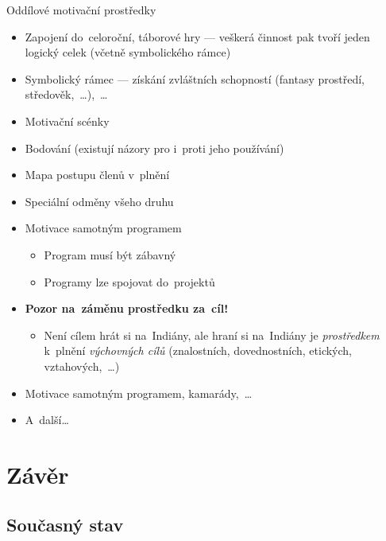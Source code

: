 \documentclass[compress, ucs, xelatex, 11pt, xcolor=dvipsnames, print, aspectratio=169,
	hyperref={
		bookmarks=true,
		unicode=true,
		colorlinks=true,
		pdftitle={Skautska vychovna metoda},
		plainpages=false,
		pdfauthor={Vojtech Zeisek},
		pdfsubject={Skautska vychovna metoda a jeji vyvoj za posledni stoleti a desetileti},
		pdfcreator={XeLaTeX},
		pdfkeywords={Junak, Pedagogika, Skaut, Skauting, Vychovna metoda},
		linkcolor=Red, %
		anchorcolor=ForestGreen, %
		citecolor=ForestGreen, %
		filecolor=ForestGreen, %
		menucolor=ForestGreen, %
		urlcolor=Sepia, %
		pdftex},
	url={hyphens, lowtilde} %
	]{beamer}
\begin{document}
\begin{frame}{Oddílové motivační prostředky}
	\begin{itemize}
		\item Zapojení do~celoroční, táborové hry --- veškerá činnost pak tvoří jeden logický celek (včetně symbolického rámce)
		\item Symbolický rámec --- získání zvláštních schopností (fantasy prostředí, středověk,~\ldots),~\ldots
		\item Motivační scénky
		\item Bodování (existují názory pro i~proti jeho používání)
		\item Mapa postupu členů v~plnění
		\item Speciální odměny všeho druhu
		\item Motivace samotným programem
		\begin{itemize}
			\item Program musí být zábavný
			\item Programy lze spojovat do~projektů
		\end{itemize}
		\item \textbf{Pozor na~záměnu prostředku za~cíl!}
		\begin{itemize}
			\item Není cílem hrát si na~Indiány, ale hraní si na~Indiány je \textit{prostředkem} k~plnění \textit{výchovných cílů} (znalostních, dovednostních, etických, vztahových,~\ldots)
		\end{itemize}
		\item Motivace samotným programem, kamarády,~\ldots
		\item A~další\ldots
	\end{itemize}
\end{frame}

\section{Závěr}

\subsection{Současný stav}
\end{document}
